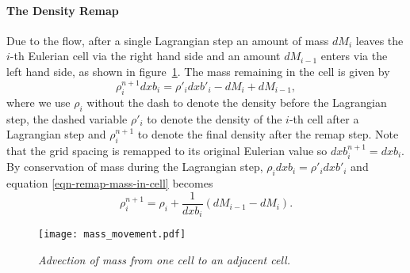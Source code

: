 \paragraph{The Density Remap}
Due to the flow, after a single Lagrangian step an amount of mass $dM_i$ leaves the $i$-th Eulerian cell via the right hand side and an amount $dM_{i-1}$ enters via the left hand side, as shown in figure~\ref{fig:mass_movement}. The mass remaining in the cell is given by
\begin{equation}
  \rho^{n+1}_i dxb_i = \rho'_i dxb'_i - dM_i + dM_{i-1},
  \label{eqn-remap-mass-in-cell}
\end{equation}
where we use $\rho_i$ without the dash to denote the density before the Lagrangian step, the dashed variable $\rho'_i$ to denote the density of the $i$-th cell after a Lagrangian step and $\rho_i^{n+1}$ to denote the final density after the remap step. Note that the grid spacing is remapped to its original Eulerian value so $dxb^{n+1}_i = dxb_i$. By conservation of mass during the Lagrangian step, $\rho_i dxb_i = \rho'_i dxb'_i$ and equation \eqref{eqn-remap-mass-in-cell} becomes
\begin{equation}
  \rho^{n+1}_i = \rho_i + \frac{1}{dxb_i} (dM_{i-1} - dM_i).
  \label{eqn-remap-density}
\end{equation}

\begin{figure}[t]
  \centering
  \texttt{[image: mass\_movement.pdf]}
  \caption{\emph{Advection of mass from one cell to an adjacent cell.}}%
  \label{fig:mass_movement}
\end{figure}

